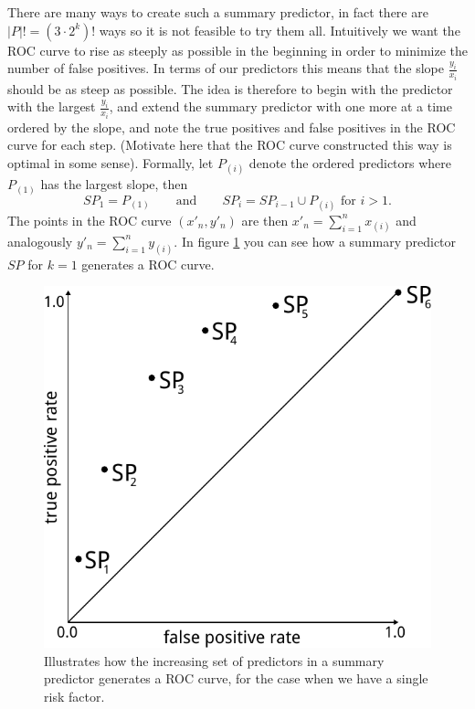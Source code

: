 \documentclass[a4paper]{article}
\begin{document}
There are many ways to create such a summary predictor, in fact there are $|P|!=(3\cdot2^k)!$ ways so it is not feasible to try them all. Intuitively we want the ROC curve to rise as steeply as possible in the beginning in order to minimize the number of false positives. In terms of our predictors this means that the slope $\frac{y_i}{x_i}$ should be as steep as possible. The idea is therefore to begin with the predictor with the largest $\frac{y_i}{x_i}$, and extend the summary predictor with one more at a time ordered by the slope, and note the true positives and false positives in the ROC curve for each step. (Motivate here that the ROC curve constructed this way is optimal in some sense). Formally, let $P_{(i)}$ denote the ordered predictors where $P_{(1)}$ has the largest slope, then 
$$SP_1 = P_{(1)} \qquad \text{and} \qquad SP_i = SP_{i-1} \cup P_{(i)} \text{ for } i > 1.$$
The points in the ROC curve $(x'_n, y'_n)$ are then $x'_n = \sum_{i=1}^n x_{(i)}$ and analogously $y'_n = \sum_{i=1}^n y_{(i)}$. In figure \ref{fig:roc} you can see how a summary predictor $SP$ for $k=1$ generates a ROC curve.

\begin{figure}[h]
  \centering
  \includegraphics[scale=0.5]{graphics/roc}
  \caption{Illustrates how the increasing set of predictors in a summary predictor generates a ROC curve, for the case when we have a single risk factor.}\label{fig:roc}
\end{figure}
\end{document}
